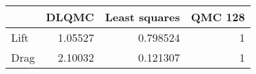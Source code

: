 \begin{tabular}{lrrr}
\toprule
      &   DLQMC &   Least squares &   QMC 128 \\
\midrule
 Lift & 1.05527 &        0.798524 &         1 \\
 Drag & 2.10032 &        0.121307 &         1 \\
\bottomrule
\end{tabular}
